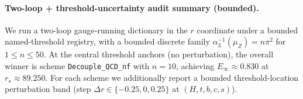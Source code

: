 \paragraph{Two-loop + threshold-uncertainty audit summary (bounded).}
\AuditTag We run a two-loop gauge-running dictionary in the $r$ coordinate under a bounded named-threshold registry, with a bounded discrete family $\alpha_3^{-1}(\mu_Z)=n\pi^2$ for $1\le n\le 50$. At the central threshold anchors (no perturbation), the overall winner is scheme \texttt{Decouple\_QCD\_nf} with $n=10$, achieving $E_\infty\approx 0.830$ at $r_\star\approx 89.250$. For each scheme we additionally report a bounded threshold-location perturbation band (step $\Delta r\in\{-0.25,0,0.25\}$ at $(H,t,b,c,s)$).
